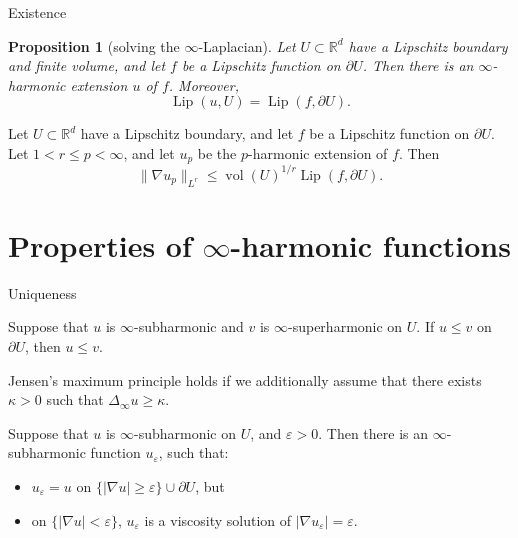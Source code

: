 \documentclass[10pt]{beamer}
\newcommand{\RR}{\mathbb{R}}
\DeclareMathOperator{\Lip}{Lip}
\newtheorem{proposition}{Proposition}
\begin{document}
\begin{frame}{Existence} 
\begin{proposition}[solving the $\infty$-Laplacian]
Let $U \subset \RR^d$ have a Lipschitz boundary and finite volume, and let $f$ be a Lipschitz function on $\partial U$.
Then there is an $\infty$-harmonic extension $u$ of $f$. Moreover,
$$\Lip(u, U) = \Lip(f, \partial U).$$
\end{proposition}

\begin{lemma}
Let $U \subset \RR^d$ have a Lipschitz boundary, and let $f$ be a Lipschitz function on $\partial U$.
Let $1 < r \leq p < \infty$, and let $u_p$ be the $p$-harmonic extension of $f$. Then
$$\|\nabla u_p\|_{L^r} \leq \operatorname{vol}(U)^{1/r} \Lip(f, \partial U) .$$
\end{lemma}
\end{frame}

\section{Properties of \texorpdfstring{$\infty$-harmonic}{infinity-harmonic} functions}

\begin{frame}{Uniqueness}
\begin{theorem}
Suppose that $u$ is $\infty$-subharmonic and $v$ is $\infty$-superharmonic on $U$.
If $u \leq v$ on $\partial U$, then $u \leq v$.
\end{theorem}

\begin{lemma}
Jensen's maximum principle holds if we additionally assume that there exists $\kappa > 0$ such that $\Delta_\infty u \geq \kappa$.
\end{lemma}

\begin{lemma}
Suppose that $u$ is $\infty$-subharmonic on $U$, and $\varepsilon > 0$.
Then there is an $\infty$-subharmonic function $u_\varepsilon$, such that: 
\begin{itemize}
\item $u_\varepsilon = u$ on $\{|\nabla u| \geq \varepsilon\} \cup \partial U$, but  
\item on $\{|\nabla u| < \varepsilon\}$, $u_\varepsilon$ is a viscosity solution of $|\nabla u_\varepsilon| = \varepsilon$.
\end{itemize}
\end{lemma}
\end{frame}
\end{document}
